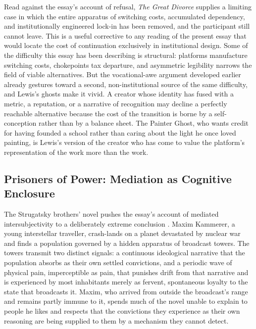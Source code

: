 \documentclass[11pt]{article}
\begin{document}
Read against the essay's account of refusal, \emph{The Great Divorce} supplies a limiting case in which the entire apparatus of switching costs, accumulated dependency, and institutionally engineered lock-in has been removed, and the participant still cannot leave. This is a useful corrective to any reading of the present essay that would locate the cost of continuation exclusively in institutional design. Some of the difficulty this essay has been describing is structural: platforms manufacture switching costs, chokepoints tax departure, and asymmetric legibility narrows the field of viable alternatives. But the vocational-awe argument developed earlier already gestures toward a second, non-institutional source of the same difficulty, and Lewis's ghosts make it vivid. A creator whose identity has fused with a metric, a reputation, or a narrative of recognition may decline a perfectly reachable alternative because the cost of the transition is borne by a self-conception rather than by a balance sheet. The Painter Ghost, who wants credit for having founded a school rather than caring about the light he once loved painting, is Lewis's version of the creator who has come to value the platform's representation of the work more than the work.

\subsection{Prisoners of Power: Mediation as Cognitive Enclosure}

The Strugatsky brothers' novel pushes the essay's account of mediated intersubjectivity to a deliberately extreme conclusion \citep{strugatsky1971prisoners}. Maxim Kammerer, a young interstellar traveller, crash-lands on a planet devastated by nuclear war and finds a population governed by a hidden apparatus of broadcast towers. The towers transmit two distinct signals: a continuous ideological narrative that the population absorbs as their own settled convictions, and a periodic wave of physical pain, imperceptible as pain, that punishes drift from that narrative and is experienced by most inhabitants merely as fervent, spontaneous loyalty to the state that broadcasts it. Maxim, who arrived from outside the broadcast's range and remains partly immune to it, spends much of the novel unable to explain to people he likes and respects that the convictions they experience as their own reasoning are being supplied to them by a mechanism they cannot detect.
\end{document}
